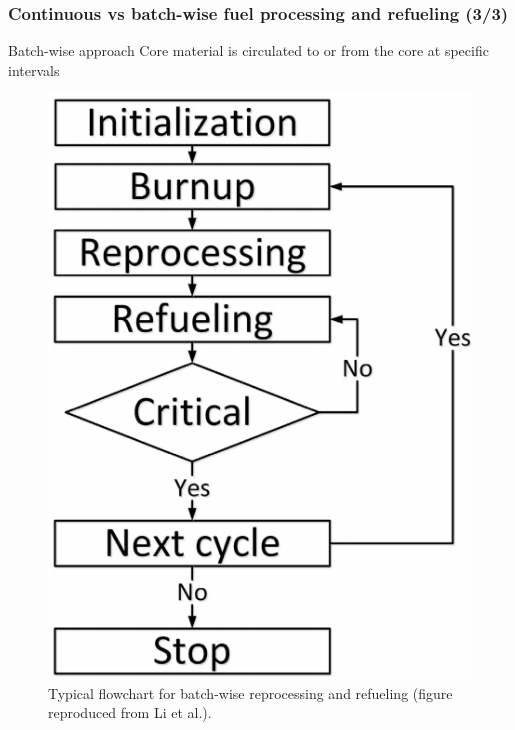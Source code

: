 \begin{frame}
\frametitle{Continuous vs batch-wise fuel processing and refueling (3/3)}
	\begin{block}{Batch-wise approach}
		Core material is circulated to or from the core at specific intervals		
	\end{block}
           \begin{figure}[t]
	\includegraphics[height=0.45\textwidth]{./images/batch-wise.png}
	\caption{Typical flowchart for batch-wise reprocessing and refueling (figure reproduced from Li et al.\cite{li_optimization_2018}).}
			\end{figure}               
\end{frame}

